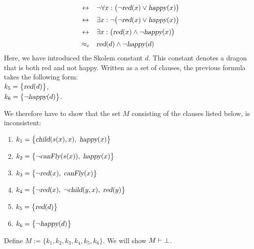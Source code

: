 \begin{enumerate}
$$\begin{array}{lcl}
         & \leftrightarrow & \neg \forall x: \bigl(\neg \textsl{red}(x) \vee \textsl{happy}(x) \bigr)
         \\[0.2cm]
         & \leftrightarrow & \exists x: \neg \bigl(\neg \textsl{red}(x) \vee \textsl{happy}(x) \bigr)
         \\[0.2cm]
         & \leftrightarrow & \exists x: \bigl(\textsl{red}(x) \wedge \neg \textsl{happy}(x) \bigr)
         \\[0.2cm]
         & \approx_e & \textsl{red}(d) \wedge \neg \textsl{happy}(d) \\
        \end{array}
      $$
      Here, we have introduced the Skolem constant  $d$.  This constant denotes a dragon that is both red
      and not happy.  Written as a set of clauses, the previous formula takes the following form:
      \\[0.2cm]
      \hspace*{1.3cm} $k_5 = \bigl\{ \textsl{red}(d) \bigl\}$, \\[0.2cm]
      \hspace*{1.3cm} $k_6 = \bigl\{ \neg \textsl{happy}(d) \bigl\}$.
\end{enumerate}
We therefore have to show that the set  $M$ consisting of the clauses listed below, is inconsistent:
\begin{enumerate}
\item $k_1 = \bigl\{ \textsl{child}(s(x),x),\; \textsl{happy}(x) \bigl\}$  
\item $k_2 = \bigl\{ \neg \textsl{canFly}(s(x)),\; \textsl{happy}(x) \bigl\}$
\item $k_3 = \bigl\{ \neg \textsl{red}(x),\; \textsl{canFly}(x) \bigl\}$
\item $k_4 = \bigl\{ \neg \textsl{red}(x),\; \neg \textsl{child}(y,x),\; \textsl{red}(y) \bigl\}$
\item $k_5 = \bigl\{ \textsl{red}(d) \bigl\}$ 
\item $k_6 = \bigl\{ \neg \textsl{happy}(d) \bigl\}$
\end{enumerate}
Define $M := \bigl\{k_1,k_2,k_3,k_4,k_5,k_6\bigl\}$.  We will show $M \vdash \bot$.
